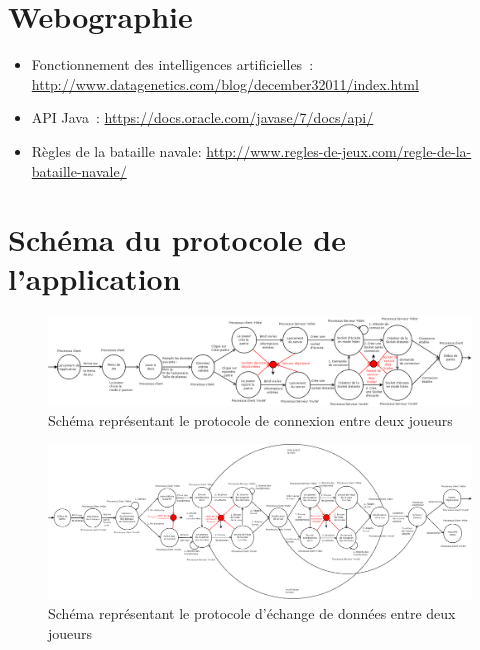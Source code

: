 \begin{appendices}
\begin{itemize}
   
\end{itemize}


\newpage
\section{Webographie}
\begin{itemize}
	\item Fonctionnement des intelligences artificielles~: \url{http://www.datagenetics.com/blog/december32011/index.html}
\newline	
	\item API Java~: \url{https://docs.oracle.com/javase/7/docs/api/}
	\newline
	\item Règles de la bataille navale: \url{http://www.regles-de-jeux.com/regle-de-la-bataille-navale/}
\end{itemize}

\newpage
\section{Schéma du protocole de l'application}
\begin{figure}
    \centering
    \includegraphics [width=215mm]{images/connection_between_players.png}
    \caption{Schéma représentant le protocole de connexion entre deux joueurs}
    \label{connection}
\end{figure}
\begin{figure}
    \centering
    \includegraphics [width=215mm]{images/data_exhange_between_players.png}
    \caption{Schéma représentant le protocole d'échange de données entre deux joueurs}
    \label{connection}
\end{figure}

\end{appendices}
